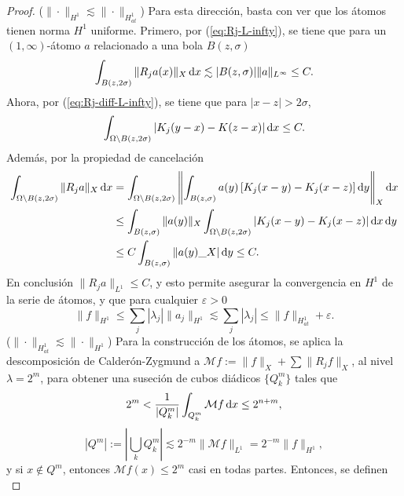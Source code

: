 \begin{proof}
	($\|\cdot\|_{H^1} \lesssim \|\cdot\|_{H^1_{at}}$) Para esta dirección, basta con ver que los átomos tienen norma $H^1$ uniforme. Primero, por (\ref{eq:Rj-L-infty}), se tiene que para un $(1,\infty)$-átomo $a$ relacionado a una bola $B(z, \sigma)$
	\begin{equation*}
		\int_{B(z, 2\sigma)}\|R_j a(x) \|_X\mathop{}\!\mathrm{d} x \lesssim |B(z, \sigma)|\|a\|_{L^\infty} \leq C.
	\end{equation*}
	Ahora, por (\ref{eq:Rj-diff-L-infty}), se tiene que para $|x-z|>2\sigma$, 
	\begin{equation*}
		\int_{\Omega\setminus B(z, 2\sigma)} |K_j(y-x) - K(z-x)|\mathop{}\!\mathrm{d} x \leq C.
	\end{equation*}
	Además, por la propiedad de cancelación
	\begin{align*}
		\int_{\Omega\setminus B(z, 2\sigma)} \|R_ja\|_X\mathop{}\!\mathrm{d} x & = \int_{\Omega\setminus B(z, 2\sigma)} \left\| \int_{B(z, \sigma)} a(y)  \left[ K_j(x - y)- K_j(x - z) \right] \mathop{}\!\mathrm{d} y
		\right\|_X \mathop{}\!\mathrm{d} x \\
		& \leq  \int_{B(z, \sigma)}\|a(y)\|_X \int_{\Omega\setminus B(z, 2\sigma)} |K_j(x - y)- K_j(x - z)| \mathop{}\!\mathrm{d} x \mathop{}\!\mathrm{d} y \\
		& \leq C \int_{B(z, \sigma)}\|a(y)\_X| \mathop{}\!\mathrm{d} y \leq C.
	\end{align*}
	En conclusión $\|R_j a\|_{L^1} \leq C$, y esto permite asegurar la convergencia en $H^1$ de la serie de átomos, y que  para cualquier $\varepsilon>0$
	\begin{equation*}
		\|f\|_{H^1}  \leq \sum_j |\lambda_j| \|a_j\|_{H^1} \lesssim \sum_j |\lambda_j| \leq \|f\|_{H^1_{at}} + \varepsilon.
	\end{equation*}
	($\|\cdot\|_{H^1_{at}}\lesssim \|\cdot\|_{H^1}$) Para la construcción de los átomos,  se aplica la descomposición de Calderón-Zygmund a $\mathcal{M}f:= \|f\|_X + \sum \|R_jf\|_X$, al nivel $\lambda=2^m$, para obtener una suseción de cubos diádicos $\{Q_k^m\}$ tales que 
	\begin{equation*}
		2^m < \frac{1}{|Q_k^m|}\int_{Q_k^m} \mathcal{M}f\mathop{}\!\mathrm{d} x \leq 2^{n+m},
	\end{equation*}
	\begin{equation*}
		|Q^m| := \left|\bigcup_k Q_k^m\right| \lesssim 2^{-m}\|\mathcal{M}f\| _{L^1}= 2^{-m}\|f\|_{H^1},
	\end{equation*}
	y si $x\notin Q^m$, entonces $\mathcal{M}f(x) \leq 2^m$ casi en todas partes. Entonces, se definen 
	\begin{equation*}

\end{equation*}
\end{proof}
